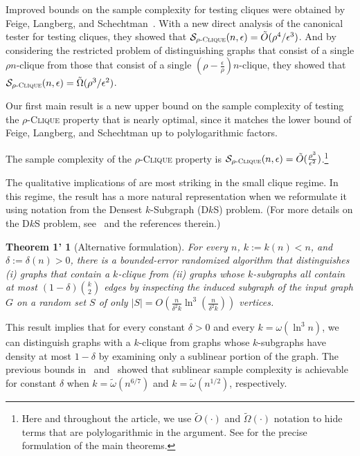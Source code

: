 \documentclass[11pt]{article}
\begin{document}
Improved bounds on the sample complexity for testing cliques were obtained by Feige, Langberg, and Schechtman~\cite{feigeCliqueTesting2004}.
With a new direct analysis of the canonical tester for testing cliques, they showed that $\mathcal{S}_{\rho\textsc{-Clique}}(n,\epsilon) = \tilde{O}(\rho^4/\epsilon^3)$.
And by considering the restricted problem of distinguishing graphs that consist of a single $\rho n$-clique from those that consist of a single $(\rho - \frac{\epsilon}{\rho})n$-clique, they showed that
$\mathcal{S}_{\rho\textsc{-Clique}}(n,\epsilon) = \tilde{\Omega}(\rho^3/\epsilon^2)$.


Our first main result is a new upper bound on the sample complexity of testing the \textsc{$\rho$-Clique} property that is nearly optimal, since it matches the lower bound of Feige, Langberg, and Schechtman up to polylogarithmic factors. 

\begin{theorem}
\label{thm:clique}
The sample complexity of the \textsc{$\rho$-Clique} property is $\mathcal{S}_{\rho\textsc{-Clique}}(n,\epsilon) = \tilde{O}(\frac{\rho^3}{\epsilon^2})$.\footnote{Here and throughout the article, we use $\tilde{O}(\cdot)$ and $\tilde{\Omega}(\cdot)$ notation to hide terms that are polylogarithmic in the argument. See  for the precise formulation of the main theorems.}
\end{theorem}

The qualitative implications of  are most striking in the small clique regime. In this regime, the result has a more natural representation when we reformulate it using notation from the Densest $k$-Subgraph (D$k$S) problem. (For more details on the D$k$S problem, see~\cite{Manurangsi2017} and the references therein.)

\newtheorem*{clique-thm-alt}{Theorem 1'}
\hypertarget{thm:clique-alt}{\begin{clique-thm-alt}[Alternative formulation]
For every $n$, $k := k(n) < n$, and $\delta := \delta(n) > 0$, there is a bounded-error randomized algorithm that distinguishes (i) graphs that contain a $k$-clique from (ii) graphs whose $k$-subgraphs all contain at most $(1-\delta) \binom{k}{2}$ edges by inspecting the induced subgraph of the input graph $G$ on a random set $S$ of only $|S| = O(\frac{n}{\delta^2 k} \ln^3 (\frac{n}{\delta^2 k}))$ vertices.
\end{clique-thm-alt}}

This result implies that for every constant $\delta > 0$ and every $k = \omega(\ln^3 n)$, we can distinguish graphs with a $k$-clique from graphs whose $k$-subgraphs have density at most $1-\delta$ by examining only a sublinear portion of the graph. The previous bounds in~\cite{goldreichPropertyTesting1998} and~\cite{feigeCliqueTesting2004} showed that sublinear sample complexity is achievable for constant $\delta$  when $k = \tilde{\omega}(n^{6/7})$ and $k = \tilde{\omega}(n^{1/2})$, respectively.
\end{document}
